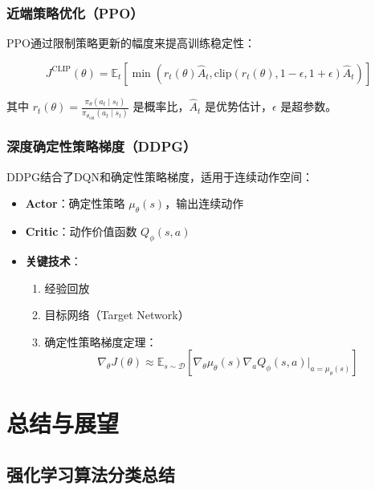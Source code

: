 \subsubsection{近端策略优化（PPO）}
PPO通过限制策略更新的幅度来提高训练稳定性：

\[
J^{\text{CLIP}}(\theta) = \mathbb{E}_t\left[\min\left(r_t(\theta) \hat{A}_t, \text{clip}(r_t(\theta), 1-\epsilon, 1+\epsilon) \hat{A}_t\right)\right]
\]

其中 $r_t(\theta) = \frac{\pi_\theta(a_t \mid s_t)}{\pi_{\theta_{\text{old}}}(a_t \mid s_t)}$ 是概率比，$\hat{A}_t$ 是优势估计，$\epsilon$ 是超参数。

\subsubsection{深度确定性策略梯度（DDPG）}
DDPG结合了DQN和确定性策略梯度，适用于连续动作空间：

\begin{itemize}
    \item \textbf{Actor}：确定性策略 $\mu_\theta(s)$，输出连续动作
    \item \textbf{Critic}：动作价值函数 $Q_\phi(s, a)$
    \item \textbf{关键技术}：
    \begin{enumerate}
        \item 经验回放
        \item 目标网络（Target Network）
        \item 确定性策略梯度定理：
        \[
        \nabla_\theta J(\theta) \approx \mathbb{E}_{s \sim \mathcal{D}}\left[\nabla_\theta \mu_\theta(s) \nabla_a Q_\phi(s, a)\big|_{a=\mu_\theta(s)}\right]
        \]
    \end{enumerate}
\end{itemize}

\section{总结与展望}

\subsection{强化学习算法分类总结}

